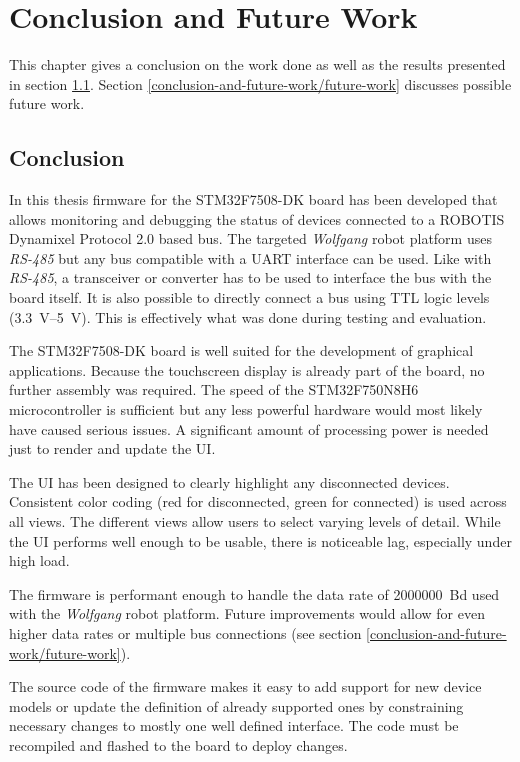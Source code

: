 \chapter{Conclusion and Future Work}
\label{conclusion-and-future-work}

This chapter gives a conclusion on the work done as well as the results presented in section
\ref{conclusion-and-future-work/conclusion}. Section \ref{conclusion-and-future-work/future-work}
discusses possible future work.

\section{Conclusion}
\label{conclusion-and-future-work/conclusion}

In this thesis firmware for the STM32F7508-DK board has been developed that allows monitoring and
debugging the status of devices connected to a ROBOTIS Dynamixel Protocol 2.0 based bus. The targeted
\textit{Wolfgang} robot platform uses \textit{RS-485} but any bus compatible with a UART interface
can be used. Like with \textit{RS-485}, a transceiver or converter has to be used to interface the
bus with the board itself. It is also possible to directly connect a bus using TTL logic levels
(\SIrange{3.3}{5}{\volt}). This is effectively what was done during testing and evaluation.

The STM32F7508-DK board is well suited for the development of graphical applications. Because the
touchscreen display is already part of the board, no further assembly was required. The speed of
the STM32F750N8H6 microcontroller is sufficient but any less powerful hardware would most likely
have caused serious issues. A significant amount of processing power is needed just to render and
update the UI.

The UI has been designed to clearly highlight any disconnected devices. Consistent color coding
(red for disconnected, green for connected) is used across all views. The different views allow
users to select varying levels of detail. While the UI performs well enough to be usable, there
is noticeable lag, especially under high load.

The firmware is performant enough to handle the data rate of \SI{2000000}{Bd} used with the
\textit{Wolfgang} robot platform. Future improvements would allow for even higher data rates or
multiple bus connections (see section \ref{conclusion-and-future-work/future-work}).

The source code of the firmware makes it easy to add support for new device models or update the
definition of already supported ones by constraining necessary changes to mostly one well defined
interface. The code must be recompiled and flashed to the board to deploy changes.


